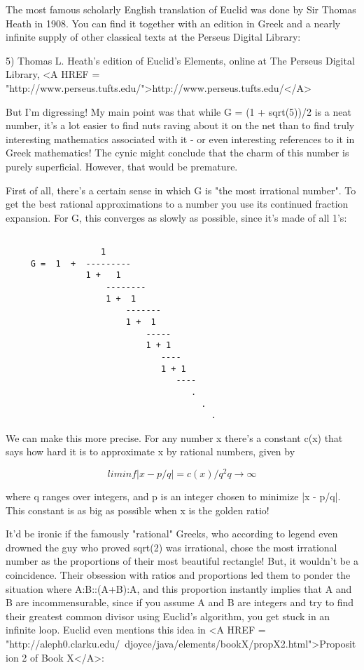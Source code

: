 The most famous scholarly English translation of Euclid was done by 
Sir Thomas Heath in 1908.  You can find it together with an edition
in Greek and a nearly infinite supply of other classical texts at 
the Perseus Digital Library:

5) Thomas L. Heath's edition of Euclid's Elements, online at
The Perseus Digital Library, <A HREF = "http://www.perseus.tufts.edu/">http://www.perseus.tufts.edu/</A>

But I'm digressing!  My main point was that while G = (1 + sqrt(5))/2
is a neat number, it's a lot easier to find nuts raving about it on the 
net than to find truly interesting mathematics associated with it - or 
even interesting references to it in Greek mathematics!  The cynic might 
conclude that the charm of this number is purely superficial.  However,
that would be premature.  

First of all, there's a certain sense in which G is "the most irrational 
number".  To get the best rational approximations to a number you use its 
continued fraction expansion.  For G, this converges as slowly as possible, 
since it's made of all 1's:


\begin{verbatim}

                   1
     G =  1  +  ---------
                1 +   1
                    -------- 
                    1 +  1
                        -------
                        1 +  1
                            -----
                            1 + 1
                               ----  
                               1 + 1
                                  ----
                                     .
                                       .
                                         .
\end{verbatim}
    
We can make this more precise.  For any number x there's a constant
c(x) that says how hard it is to approximate x by rational numbers, 
given by


$$

        lim inf      |x - p/q|   = c(x)/q^{2}
      q \to  \infty 
$$
    
where q ranges over integers, and p is an integer chosen to minimize
|x - p/q|.   This constant is as big as possible when x is the golden
ratio!   

It'd be ironic if the famously "rational" Greeks, who according to 
legend 
even drowned the guy who proved sqrt(2) was irrational, chose the most 
irrational number as the proportions of their most beautiful rectangle!  
But, it wouldn't be a coincidence.  Their obsession with ratios and 
proportions led them to ponder the situation where A:B::(A+B):A,    
and this proportion instantly implies that A and B are incommensurable, 
since if you assume A and B are integers and try to find their greatest 
common divisor using Euclid's algorithm, you get stuck in an infinite loop.
Euclid even mentions this idea in <A HREF = "http://aleph0.clarku.edu/~djoyce/java/elements/bookX/propX2.html">Proposition 2 of Book X</A>:

